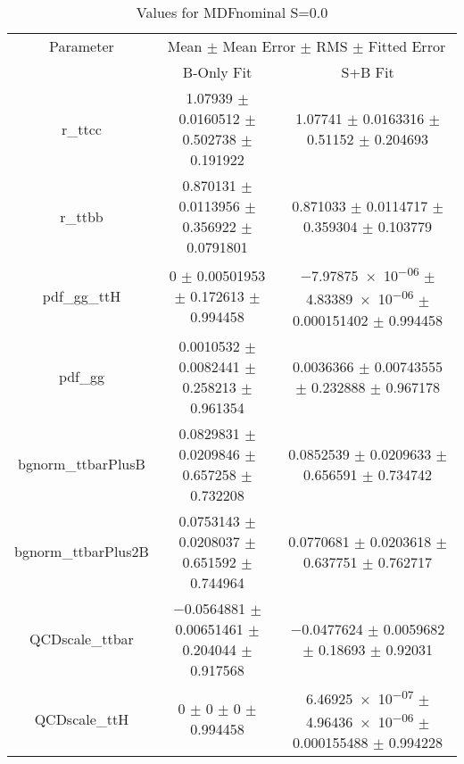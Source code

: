 \begin{table}
\centering
\caption{Values for MDFnominal S=0.0}
\begin{tabular}{ccc}
\toprule
Parameter & \multicolumn{2}{c}{Mean $\pm$ Mean Error $\pm$ RMS $\pm$ Fitted Error}\\
 & B-Only Fit & S+B Fit\\
\midrule
r\_ttcc & \num{1.07939} $\pm$ \num{0.0160512} $\pm$ \num{0.502738} $\pm$ \num{0.191922} & \num{1.07741} $\pm$ \num{0.0163316} $\pm$ \num{0.51152} $\pm$ \num{0.204693}\\
r\_ttbb & \num{0.870131} $\pm$ \num{0.0113956} $\pm$ \num{0.356922} $\pm$ \num{0.0791801} & \num{0.871033} $\pm$ \num{0.0114717} $\pm$ \num{0.359304} $\pm$ \num{0.103779}\\
pdf\_gg\_ttH & \num{0} $\pm$ \num{0.00501953} $\pm$ \num{0.172613} $\pm$ \num{0.994458} & \num{-7.97875e-06} $\pm$ \num{4.83389e-06} $\pm$ \num{0.000151402} $\pm$ \num{0.994458}\\
pdf\_gg & \num{0.0010532} $\pm$ \num{0.0082441} $\pm$ \num{0.258213} $\pm$ \num{0.961354} & \num{0.0036366} $\pm$ \num{0.00743555} $\pm$ \num{0.232888} $\pm$ \num{0.967178}\\
bgnorm\_ttbarPlusB & \num{0.0829831} $\pm$ \num{0.0209846} $\pm$ \num{0.657258} $\pm$ \num{0.732208} & \num{0.0852539} $\pm$ \num{0.0209633} $\pm$ \num{0.656591} $\pm$ \num{0.734742}\\
bgnorm\_ttbarPlus2B & \num{0.0753143} $\pm$ \num{0.0208037} $\pm$ \num{0.651592} $\pm$ \num{0.744964} & \num{0.0770681} $\pm$ \num{0.0203618} $\pm$ \num{0.637751} $\pm$ \num{0.762717}\\
QCDscale\_ttbar & \num{-0.0564881} $\pm$ \num{0.00651461} $\pm$ \num{0.204044} $\pm$ \num{0.917568} & \num{-0.0477624} $\pm$ \num{0.0059682} $\pm$ \num{0.18693} $\pm$ \num{0.92031}\\
QCDscale\_ttH & \num{0} $\pm$ \num{0} $\pm$ \num{0} $\pm$ \num{0.994458} & \num{6.46925e-07} $\pm$ \num{4.96436e-06} $\pm$ \num{0.000155488} $\pm$ \num{0.994228}\\
\bottomrule
\end{tabular}
\end{table}